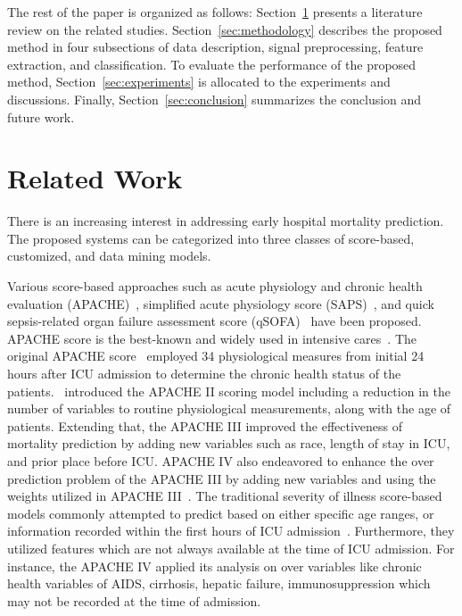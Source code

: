 \documentclass[3p]{elsarticle}
\begin{document}
The rest of the paper is organized as follows: Section~\ref{sec:related_work} presents a literature review on the related studies. Section~\ref{sec:methodology} describes the proposed method in four subsections of data description, signal preprocessing, feature extraction, and classification. To evaluate the performance of the proposed method, Section~\ref{sec:experiments} is allocated to the experiments and discussions. Finally, Section~\ref{sec:conclusion} summarizes the conclusion and future work.

\section{Related Work}
  \label{sec:related_work}

There is an increasing interest in addressing early hospital mortality prediction. The proposed systems can be categorized into three classes of score-based, customized, and data mining models.

Various score-based approaches such as acute physiology and chronic health evaluation (APACHE)~\cite{knaus_apache_1985}, simplified acute physiology score (SAPS)~\cite{le_gall_new_1993}, and quick sepsis-related organ failure assessment score (qSOFA)~\cite{simpson_new_2016} have been proposed. APACHE score is the best-known and widely used in intensive cares~\cite{vincent_critical_2010}. The original APACHE score~\cite{knaus_apache-acute_1981} employed 34 physiological measures from initial 24 hours after ICU admission to determine the chronic health status of the patients.~\cite{knaus_apache_1985} introduced the APACHE II scoring model including a reduction in the number of variables to  routine physiological measurements, along with the age of patients. Extending that, the APACHE III improved the effectiveness of mortality prediction by adding new variables such as race, length of stay in ICU, and prior place before ICU. APACHE IV also endeavored to enhance the over prediction problem of the APACHE III by adding new variables and using the weights utilized in APACHE III~\cite{zimmerman_acute_2006}. The traditional severity of illness score-based models commonly attempted to predict based on either specific age ranges, or information recorded within the first  hours of ICU admission~\cite{johnson_reproducibility_2017}. Furthermore, they utilized features which are not always available at the time of ICU admission. For instance, the APACHE IV applied its analysis on over  variables like chronic health variables of AIDS, cirrhosis, hepatic failure, immunosuppression which may not be recorded at the time of admission.
\end{document}
